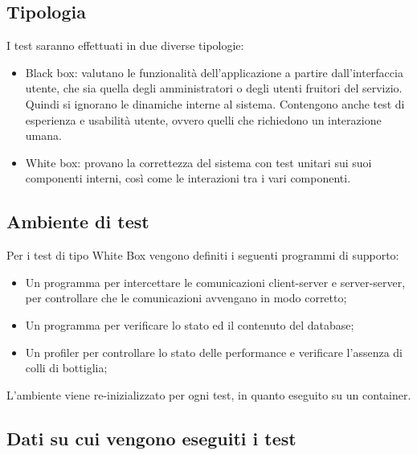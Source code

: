 \subsection{Tipologia}
I test saranno effettuati in due diverse tipologie:
\begin{itemize}
    \item Black box: valutano le funzionalità dell'applicazione a partire dall'interfaccia utente, che
          sia quella degli amministratori o degli utenti fruitori del servizio. Quindi si ignorano le dinamiche
          interne al sistema. Contengono anche test di esperienza e usabilità utente, ovvero quelli che richiedono
          un interazione umana.
    \item White box: provano la correttezza del sistema con test unitari sui suoi componenti interni,
          così come le interazioni tra i vari componenti.
\end{itemize}

\subsection{Ambiente di test}
Per i test di tipo White Box vengono definiti i seguenti programmi di supporto:
\begin{itemize}
    \item Un programma per intercettare le comunicazioni client-server e server-server, per controllare che le
          comunicazioni avvengano in modo corretto;
    \item Un programma per verificare lo stato ed il contenuto del database;
    \item Un profiler per controllare lo stato delle performance e verificare l’assenza di colli di bottiglia;
\end{itemize}
L’ambiente viene re-inizializzato per ogni test, in quanto eseguito su un container.

\subsection{Dati su cui vengono eseguiti i test}

